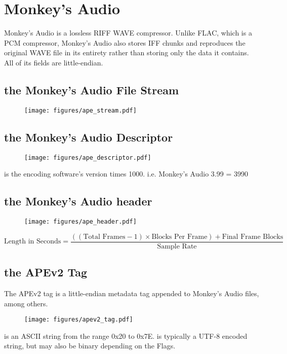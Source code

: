 
\chapter{Monkey's Audio}
Monkey's Audio is a lossless RIFF WAVE compressor.
Unlike FLAC, which is a PCM compressor, Monkey's Audio also stores
IFF chunks and reproduces the original WAVE file in its entirety rather
than storing only the data it contains.
All of its fields are little-endian.

\section{the Monkey's Audio File Stream}
\begin{figure}[h]
\texttt{[image: figures/ape\_stream.pdf]}
\end{figure}

\section{the Monkey's Audio Descriptor}
\begin{figure}[h]
\texttt{[image: figures/ape\_descriptor.pdf]}
\end{figure}
\par
\noindent
{} is the encoding software's version times 1000.
i.e. Monkey's Audio 3.99 = 3990

\section{the Monkey's Audio header}
\begin{figure}[h]
\texttt{[image: figures/ape\_header.pdf]}
\end{figure}
{
\begin{equation}
\text{Length in Seconds} = \frac{((\text{Total Frames} - 1) \times \text{Blocks Per Frame}) + \text{Final Frame Blocks}}{\text{Sample Rate}}
\end{equation}
}
\section{the APEv2 Tag}
\label{apev2}
The APEv2 tag is a little-endian metadata tag appended to
Monkey's Audio files, among others.
\begin{figure}[h]
\texttt{[image: figures/apev2\_tag.pdf]}
\end{figure}
\par
\noindent
{} is an ASCII string from the range 0x20 to 0x7E.
 is typically a UTF-8 encoded string, but may
also be binary depending on the Flags.

